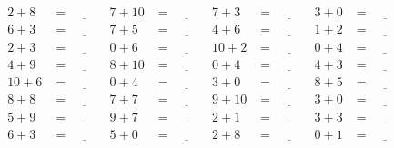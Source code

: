 \documentclass{article}
\begin{document}
\begin{sloppy}
\begin{align*}
    2 + 8 &= \underline{\hspace{1cm}} & 7 + 10 &= \underline{\hspace{1cm}} & 7 + 3 &= \underline{\hspace{1cm}} & 3 + 0 &= \underline{\hspace{1cm}} \\
    6 + 3 &= \underline{\hspace{1cm}} & 7 + 5 &= \underline{\hspace{1cm}} & 4 + 6 &= \underline{\hspace{1cm}} & 1 + 2 &= \underline{\hspace{1cm}} \\
    2 + 3 &= \underline{\hspace{1cm}} & 0 + 6 &= \underline{\hspace{1cm}} & 10 + 2 &= \underline{\hspace{1cm}} & 0 + 4 &= \underline{\hspace{1cm}} \\
    4 + 9 &= \underline{\hspace{1cm}} & 8 + 10 &= \underline{\hspace{1cm}} & 0 + 4 &= \underline{\hspace{1cm}} & 4 + 3 &= \underline{\hspace{1cm}} \\
    10 + 6 &= \underline{\hspace{1cm}} & 0 + 4 &= \underline{\hspace{1cm}} & 3 + 0 &= \underline{\hspace{1cm}} & 8 + 5 &= \underline{\hspace{1cm}} \\
    8 + 8 &= \underline{\hspace{1cm}} & 7 + 7 &= \underline{\hspace{1cm}} & 9 + 10 &= \underline{\hspace{1cm}} & 3 + 0 &= \underline{\hspace{1cm}} \\
    5 + 9 &= \underline{\hspace{1cm}} & 9 + 7 &= \underline{\hspace{1cm}} & 2 + 1 &= \underline{\hspace{1cm}} & 3 + 3 &= \underline{\hspace{1cm}} \\
    6 + 3 &= \underline{\hspace{1cm}} & 5 + 0 &= \underline{\hspace{1cm}} & 2 + 8 &= \underline{\hspace{1cm}} & 0 + 1 &= \underline{\hspace{1cm}} \\

\end{align*}
\end{sloppy}
\end{document}
